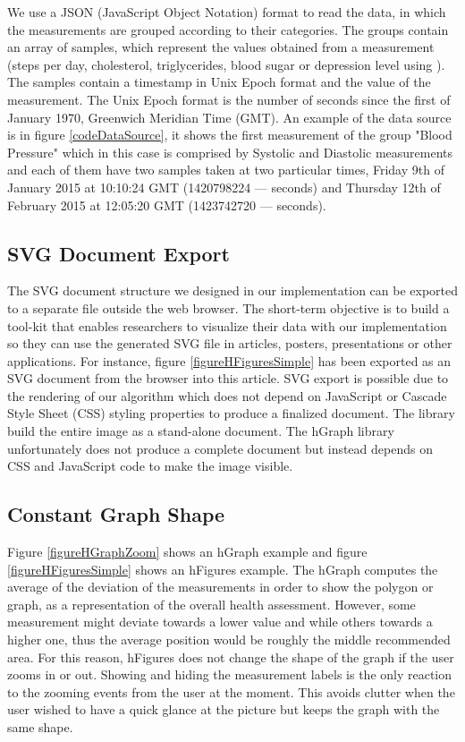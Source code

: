 \documentclass[twocolumn]{bmcart}%
\begin{document}
We use a JSON (JavaScript Object Notation) format to read the data, in which the measurements are grouped according to their categories. The groups contain an array of samples, which represent the values obtained from a measurement (steps per day, cholesterol, triglycerides, blood sugar or depression level using \cite{poutanen2010validity}). The samples contain a timestamp in Unix Epoch format and the value of the measurement. The Unix Epoch format is the number of seconds since the first of January 1970, Greenwich Meridian Time (GMT). An example of the data source is in figure \ref{codeDataSource}, it shows the first measurement of the group "Blood Pressure" which in this case is comprised by Systolic and Diastolic measurements and each of them have two samples taken at two particular times, Friday 9th of January 2015 at 10:10:24 GMT (1420798224 --- seconds) and Thursday 12th of February 2015 at 12:05:20 GMT (1423742720 --- seconds).

\subsection*{SVG Document Export}

The SVG document structure we designed in our implementation can be exported to a separate file outside the web browser. The short-term objective is to build a tool-kit that enables researchers to visualize their data with our implementation so they can use the generated SVG file in articles, posters, presentations or other applications. For instance, figure \ref{figureHFiguresSimple} has been exported as an SVG document from the browser into this article. SVG export is possible due to the rendering of our algorithm which does not depend on JavaScript or Cascade Style Sheet (CSS) styling properties to produce a finalized document. The library build the entire image as a stand-alone document. The hGraph library unfortunately does not produce a complete document but instead depends on CSS and JavaScript code to make the image visible.

\subsection*{Constant Graph Shape}

Figure \ref{figureHGraphZoom} shows an hGraph example and figure \ref{figureHFiguresSimple} shows an hFigures example. The hGraph computes the average of the deviation of the measurements in order to show the polygon or graph, as a representation of the overall health assessment. However, some measurement might deviate towards a lower value and while others towards a higher one, thus the average position would be roughly the middle recommended area. For this reason, hFigures does not change the shape of the graph if the user zooms in or out. Showing and hiding the measurement labels is the only reaction to the zooming events from the user at the moment. This avoids clutter when the user wished to have a quick glance at the picture but keeps the graph with the same shape.
\end{document}
